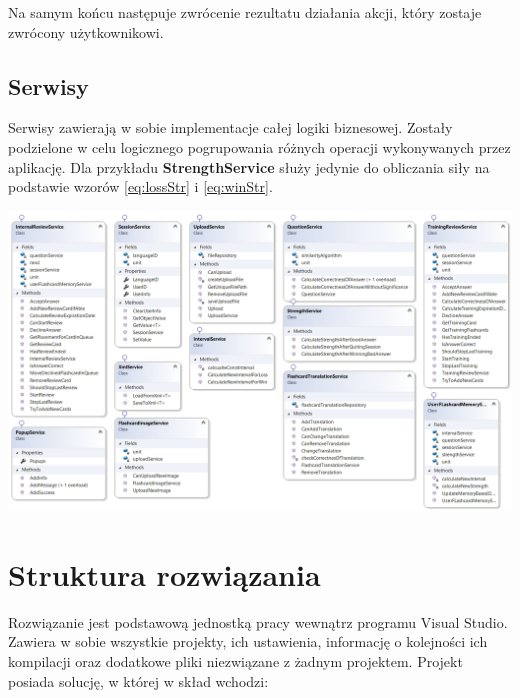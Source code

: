 Na samym końcu następuje zwrócenie rezultatu działania akcji, który zostaje zwrócony użytkownikowi.

\subsection{Serwisy}

Serwisy zawierają w sobie implementacje całej logiki biznesowej. Zostały podzielone w celu logicznego pogrupowania różnych operacji wykonywanych przez aplikację. Dla przykładu \textbf{StrengthService} służy jedynie do obliczania siły na podstawie wzorów \ref{eq:lossStr} i \ref{eq:winStr}.
\newpage

\begin{landscape}
\begin{center}
	\includegraphics[width=\paperwidth + 2.5cm]{images/Serwisy.png}
\end{center}
\end{landscape}


\section{Struktura rozwiązania}

Rozwiązanie jest podstawową jednostką pracy wewnątrz programu Visual Studio. Zawiera w sobie wszystkie projekty, ich ustawienia, informację o kolejności ich kompilacji oraz dodatkowe pliki niezwiązane z żadnym projektem. Projekt posiada solucję, w której w skład wchodzi:

